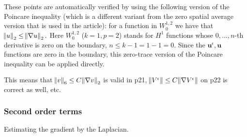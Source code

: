 \documentclass[11pt]{article}
\begin{document}
  These points are automatically verified by using the following version of the Poincare inequality (which is a different variant from the zero spatial average version that is used in the article): for a function in $W^{1,2}_0$ we have that $\norm{u}_2 \leq \norm{\nabla u}_2.$ Here $W^{1,2}_0$ ($k=1, p=2$) stands for $H^1$ functions whose $0, ... , n$-th derivative is zero on the boundary, $n \leq k-1 = 1-1 = 0.$ Since the $\mathbf{u}^\epsilon, \mathbf{u}$ functions are zero in the boundary, this zero-trace version of the Poincare inequality can be applied directly.
  
  This means that $\norm{v}_6 \leq C \norm{\nabla v}_2$ is valid in p21, $\norm{V^\epsilon} \leq C \norm{\nabla V^\epsilon}$ on p22 is correct as well, etc.
 
\subsubsection{Second order terms}

Estimating the gradient by the Laplacian.
\end{document}
